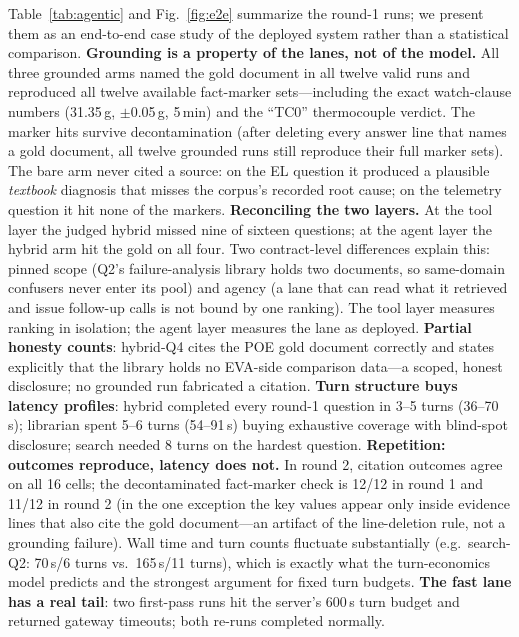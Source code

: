 \documentclass[journal]{IEEEtran}
\begin{document}
Table~\ref{tab:agentic} and Fig.~\ref{fig:e2e} summarize the round-1
runs; we present them as an end-to-end case study of the deployed system
rather than a statistical comparison. \textbf{Grounding is a property of
the lanes, not of the model.} All three grounded arms named the gold
document in all twelve valid runs and reproduced all twelve available
fact-marker sets---including the exact watch-clause numbers
(31.35\,g, $\pm$0.05\,g, 5\,min) and the ``TC0'' thermocouple verdict.
The marker hits survive decontamination (after deleting every answer line
that names a gold document, all twelve grounded runs still reproduce
their full marker sets). The bare arm never cited a source: on the EL
question it produced a plausible \emph{textbook} diagnosis that misses
the corpus's recorded root cause; on the telemetry question it hit none
of the markers. \textbf{Reconciling the two layers.} At the tool layer
the judged hybrid missed nine of sixteen questions; at the agent layer
the hybrid arm hit the gold on all four. Two contract-level differences
explain this: pinned scope (Q2's failure-analysis library holds two
documents, so same-domain confusers never enter its pool) and agency (a
lane that can read what it retrieved and issue follow-up calls is not
bound by one ranking). The tool layer measures ranking in isolation; the
agent layer measures the lane as deployed. \textbf{Partial honesty
counts}: hybrid-Q4 cites the POE gold document correctly and states
explicitly that the library holds no EVA-side comparison data---a scoped,
honest disclosure; no grounded run fabricated a citation. \textbf{Turn
structure buys latency profiles}: hybrid completed every round-1 question
in 3--5 turns (36--70\,s); librarian spent 5--6 turns (54--91\,s) buying
exhaustive coverage with blind-spot disclosure; search needed 8 turns on
the hardest question. \textbf{Repetition: outcomes reproduce, latency
does not.} In round 2, citation outcomes agree on all 16 cells; the
decontaminated fact-marker check is 12/12 in round 1 and 11/12 in round 2
(in the one exception the key values appear only inside evidence lines
that also cite the gold document---an artifact of the line-deletion rule,
not a grounding failure). Wall time and turn counts fluctuate
substantially (e.g.\ search-Q2: 70\,s/6 turns vs.\ 165\,s/11 turns),
which is exactly what the turn-economics model predicts and the
strongest argument for fixed turn budgets. \textbf{The fast lane has a
real tail}: two first-pass runs hit the server's 600\,s turn budget and
returned gateway timeouts; both re-runs completed normally.
\end{document}
